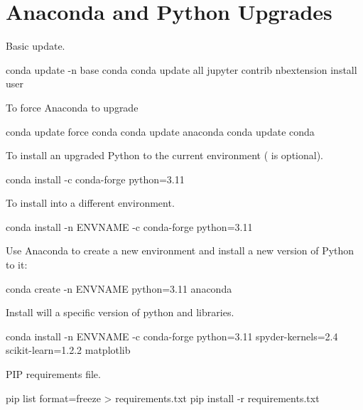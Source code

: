 	\section{Anaconda and Python Upgrades}
	\begin{numberedlist}
		\item Basic update.
		\begin{code}[\codenumbering]{}
			\codeitemnonumber conda update -n base conda
			\codeitemnonumber conda update \switch{}all
			\codeitemnonumber jupyter contrib nbextension install \switch{}user
		\end{code}
		\item To force Anaconda to upgrade
		\begin{code}[\codenumbering]{}
			\codeitemnonumber conda update \switch{}force conda
			\codeitemnonumber conda update anaconda
			\codeitemnonumber conda update conda
		\end{code}
		\item To install an upgraded Python to the current environment ( is optional).
		\begin{code}[\codenumbering]{}
			\codeitemnonumber conda install -c conda-forge python=3.11
		\end{code}
		\item To install into a different environment.
		\begin{code}[\codenumbering]{}
			\codeitemnonumber conda install -n ENVNAME -c conda-forge python=3.11
		\end{code}
		\item \important{[PREFERRED]} Use Anaconda to create a new environment and install a new version of Python to it:
		\begin{code}[\codenumbering]{}
			\codeitemnonumber conda create -n ENVNAME python=3.11 anaconda
		\end{code}
		\item Install will a specific version of python and libraries.
		\begin{code}[\codenumbering]{}
			\codeitemnonumber conda install -n ENVNAME -c conda-forge python=3.11 spyder-kernels=2.4 scikit-learn=1.2.2 matplotlib
		\end{code}

		\item PIP requirements file.
		\begin{code}[\codenumbering]{}
			\codeitemnonumber pip list \switch{}format=freeze > requirements.txt
			\codeitemnonumber pip install -r requirements.txt
		\end{code}


\end{numberedlist}
